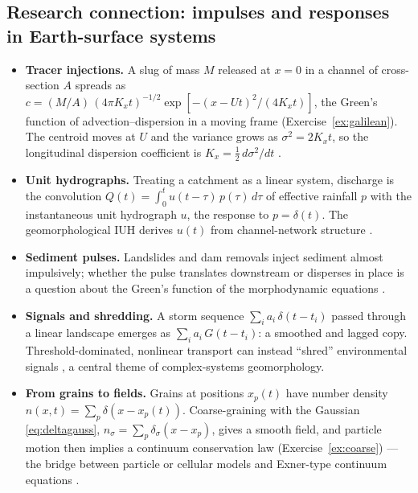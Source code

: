 \documentclass[11pt,letterpaper]{article}
\numberwithin{equation}{section}
\begin{document}
\subsection{Research connection: impulses and responses in Earth-surface systems}
\begin{research}
\begin{itemize}[leftmargin=1.2em]
  \item \textbf{Tracer injections.} A slug of mass $M$ released at $x=0$ in a channel of cross-section $A$ spreads as
        $c=(M/A)\,(4\pi K_xt)^{-1/2}\exp[-(x-Ut)^2/(4K_xt)]$, the Green's function of advection--dispersion in a moving
        frame (Exercise~\ref{ex:galilean}). The centroid moves at $U$ and the variance grows as $\sigma^2=2K_xt$, so the
        longitudinal dispersion coefficient is $K_x=\tfrac12\,d\sigma^2/dt$ \citep{fischer1979}.
  \item \textbf{Unit hydrographs.} Treating a catchment as a linear system, discharge is the convolution
        $Q(t)=\int_0^tu(t-\tau)\,p(\tau)\,d\tau$ of effective rainfall $p$ with the instantaneous unit hydrograph $u$, the
        response to $p=\delta(t)$. The geomorphological IUH derives $u(t)$ from channel-network structure
        \citep{rodriguez1979}.
  \item \textbf{Sediment pulses.} Landslides and dam removals inject sediment almost impulsively; whether the pulse
        translates downstream or disperses in place is a question about the Green's function of the morphodynamic equations
        \citep{lisle2001}.
  \item \textbf{Signals and shredding.} A storm sequence $\sum_ia_i\,\delta(t-t_i)$ passed through a linear landscape emerges
        as $\sum_ia_i\,G(t-t_i)$: a smoothed and lagged copy. Threshold-dominated, nonlinear transport can instead
        ``shred'' environmental signals \citep{jerolmack2010}, a central theme of complex-systems geomorphology.
  \item \textbf{From grains to fields.} Grains at positions $x_p(t)$ have number density $n(x,t)=\sum_p\delta(x-x_p(t))$.
        Coarse-graining with the Gaussian \eqref{eq:deltagauss}, $n_\sigma=\sum_p\delta_\sigma(x-x_p)$, gives a smooth
        field, and particle motion then implies a continuum conservation law (Exercise~\ref{ex:coarse}) --- the bridge between
        particle or cellular models \citep{murray1994} and Exner-type continuum equations \citep{furbish2012}.
\end{itemize}
\end{research}
\end{document}
